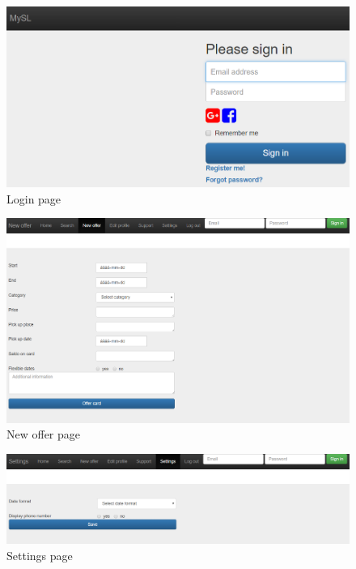 \documentclass[11pt,twoside,a4paper]{report}
\begin{document}
\begin{appendices}
\begin{figure}
	\centering
	\includegraphics[width=\textwidth]{png/webapp-login.png}
	\caption{Login page}
	\label{figure:login-page}
\end{figure}

\begin{figure}
	\centering
	\includegraphics[width=\textwidth]{png/webapp-newoffer.png}
	\caption{New offer page}
	\label{figure:new-offer-page}
\end{figure}

\begin{figure}
	\centering
	\includegraphics[width=\textwidth]{png/webapp-settings.png}
	\caption{Settings page}
	\label{figure:settings-page}
\end{figure}


\end{appendices}
\end{document}
